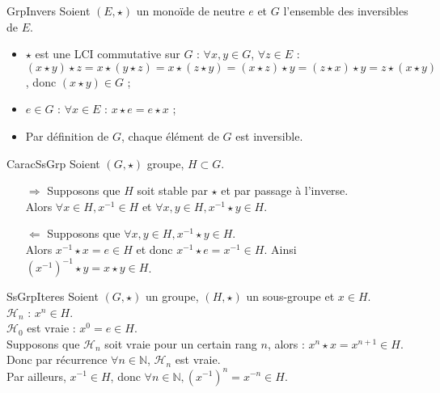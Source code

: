 \documentclass[12pt,a4paper]{report}
\begin{document}
    \begin{demonstration}{GrpInvers}
    Soient $(E, \star)$ un monoïde de neutre $e$ et $G$ l'ensemble des inversibles de $E$.
    \begin{itemize}[label=$\cdot$]
        \item $\star$ est une LCI commutative sur $G$ : $\forall x, y \in G$, $\forall z \in E$ :\\
        $(x \star y) \star z = x \star (y \star z) = x \star (z \star y) = (x \star z) \star y = (z \star x)  \star y = z \star (x \star y)$, donc $(x \star y) \in G$ ;
        \item $e \in G$ : $\forall x \in E$ : $x \star e = e \star x$ ;
        \item Par définition de $G$, chaque élément de $G$ est inversible.
    \end{itemize}
    \end{demonstration}
    
    \begin{demonstration}{CaracSsGrp}
    Soient $(G, \star)$ groupe, $H \subset G$.
    \begin{itemize}
        \item[$\Rightarrow$] Supposons que $H$ soit stable par $\star$ et par passage à l'inverse.\\
        Alors $\forall x \in H, x^{-1} \in H$ et $\forall x, y \in H, x^{-1} \star y \in H$.
        \item[$\Leftarrow$] Supposons que $\forall x, y \in H, x^{-1} \star y \in H$.\\
        Alors $x^{-1} \star x = e \in H$ et donc $x^{-1} \star e = x^{-1} \in H$. Ainsi $\left(x^{-1}\right)^{-1} \star y = x \star y \in H$.
    \end{itemize}
    \end{demonstration}
    
    \begin{demonstration}{SsGrpIteres}
    Soient $(G, \star)$ un groupe, $(H, \star)$ un sous-groupe et $x \in H$.\\
    $\mathcal{H}_n$ : $x^n \in H$.\\
    $\mathcal{H}_0$ est vraie : $x^0 = e \in H$.\\
    Supposons que $\mathcal{H}_n$ soit vraie pour un certain rang $n$, alors : $ x^n \star x = x^{n + 1} \in H $.\\
    Donc par récurrence $\forall n \in \mathbb{N}$, $\mathcal{H}_n$ est vraie.\\
    Par ailleurs, $x^{-1} \in H$, donc $\forall n \in \mathbb{N}, \left(x^{-1}\right)^n = x^{-n} \in H$.
    \end{demonstration}
    
\end{document}
